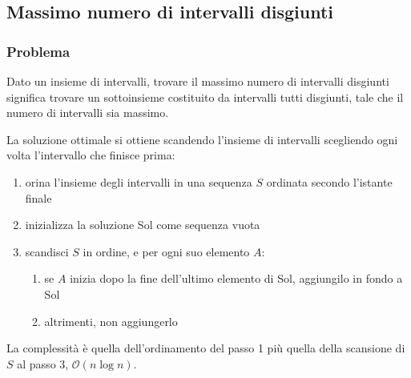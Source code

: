 \documentclass[11pt]{article}
\begin{document}
\subsection{Massimo numero di intervalli disgiunti}
\subsubsection{Problema}
Dato un insieme di intervalli, trovare il massimo numero di intervalli disgiunti significa trovare un sottoinsieme costituito 
da intervalli tutti disgiunti, tale che il numero di intervalli sia massimo.

La soluzione ottimale si ottiene scandendo l'insieme di intervalli scegliendo ogni volta l'intervallo che finisce prima:
\begin{enumerate}
    \item orina l'insieme degli intervalli in una sequenza $S$ ordinata secondo l'istante finale
    \item inizializza la soluzione Sol come sequenza vuota 
    \item scandisci $S$ in ordine, e per ogni suo elemento $A$:
    \begin{enumerate}
        \item se $A$ inizia dopo la fine dell'ultimo elemento di Sol, aggiungilo in fondo a Sol 
        \item altrimenti, non aggiungerlo 
    \end{enumerate}
\end{enumerate}
La complessità è quella dell'ordinamento del passo 1 più quella della scansione di $S$ al passo 3, $\mathcal{O}(n\log n)$.
\end{document}
